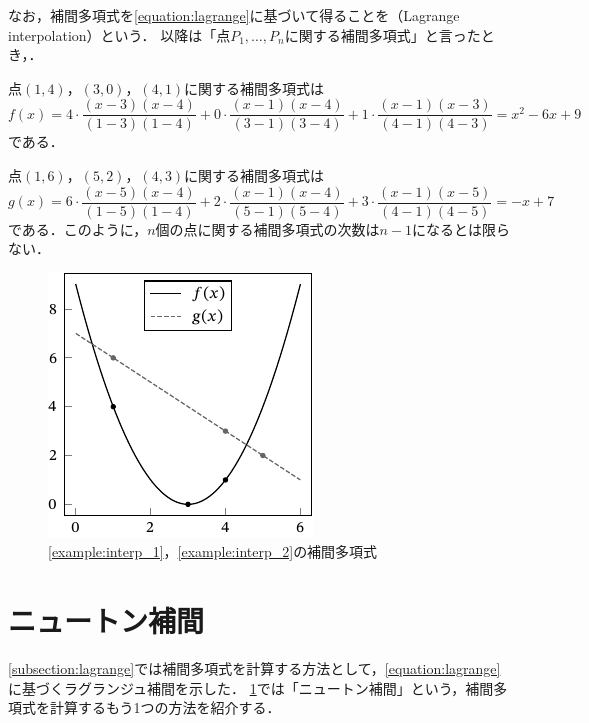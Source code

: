 \documentclass[../../main]{subfiles}
\begin{document}
なお，補間多項式を\cref{equation:lagrange}に基づいて得ることを（Lagrange interpolation）という．
以降は「点\(P_1,\dots,P_n\)に関する補間多項式」と言ったとき，．

\begin{example}
\label{example:interp_1}
点\((1,4)\)，\((3,0)\)，\((4,1)\)に関する補間多項式は
\[
  f(x) = 4\cdot\frac{(x-3)(x-4)}{(1-3)(1-4)}+0\cdot\frac{(x-1)(x-4)}{(3-1)(3-4)}+1\cdot\frac{(x-1)(x-3)}{(4-1)(4-3)}
  = x^2-6x+9
\]
である．
\end{example}

\begin{example}
\label{example:interp_2}
点\((1,6)\)，\((5,2)\)，\((4,3)\)に関する補間多項式は
\[
  g(x) = 6\cdot\frac{(x-5)(x-4)}{(1-5)(1-4)}+2\cdot\frac{(x-1)(x-4)}{(5-1)(5-4)}+3\cdot\frac{(x-1)(x-5)}{(4-1)(4-5)}
  = -x+7
\]
である．このように，\(n\)個の点に関する補間多項式の次数は\(n-1\)になるとは限らない．
\end{example}

\begin{figure}[htbp]
  \centering
  \includegraphics{interpolation.pdf}
  \caption{\cref{example:interp_1}，\cref{example:interp_2}の補間多項式}
\end{figure}

\section{ニュートン補間}
\label{subsection:newton}
\cref{subsection:lagrange}では補間多項式を計算する方法として，\cref{equation:lagrange}に基づくラグランジュ補間を示した．
\cref{subsection:newton}では「ニュートン補間」という，補間多項式を計算するもう1つの方法を紹介する．
\end{document}
